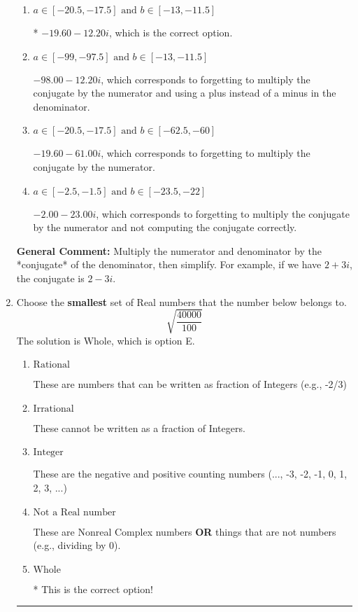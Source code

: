 \documentclass{extbook}[14pt]
\newcommand{\litem}[1]{\item #1

\rule{\textwidth}{0.4pt}}
\begin{document}
\begin{enumerate}
{\begin{enumerate}[label=\Alph*.]
 $-13.50  - 44.00 i$, which corresponds to just dividing the first term by the first term and the second by the second.
\item \( a \in [-20.5, -17.5] \text{ and } b \in [-13, -11.5] \)

* $-19.60  - 12.20 i$, which is the correct option.
\item \( a \in [-99, -97.5] \text{ and } b \in [-13, -11.5] \)

 $-98.00  - 12.20 i$, which corresponds to forgetting to multiply the conjugate by the numerator and using a plus instead of a minus in the denominator.
\item \( a \in [-20.5, -17.5] \text{ and } b \in [-62.5, -60] \)

 $-19.60  - 61.00 i$, which corresponds to forgetting to multiply the conjugate by the numerator.
\item \( a \in [-2.5, -1.5] \text{ and } b \in [-23.5, -22] \)

 $-2.00  - 23.00 i$, which corresponds to forgetting to multiply the conjugate by the numerator and not computing the conjugate correctly.
\end{enumerate}

\textbf{General Comment:} Multiply the numerator and denominator by the *conjugate* of the denominator, then simplify. For example, if we have $2+3i$, the conjugate is $2-3i$.
}
\litem{
Choose the \textbf{smallest} set of Real numbers that the number below belongs to.
\[ \sqrt{\frac{40000}{100}} \]The solution is \( \text{Whole} \), which is option E.\begin{enumerate}[label=\Alph*.]
\item \( \text{Rational} \)

These are numbers that can be written as fraction of Integers (e.g., -2/3)
\item \( \text{Irrational} \)

These cannot be written as a fraction of Integers.
\item \( \text{Integer} \)

These are the negative and positive counting numbers (..., -3, -2, -1, 0, 1, 2, 3, ...)
\item \( \text{Not a Real number} \)

These are Nonreal Complex numbers \textbf{OR} things that are not numbers (e.g., dividing by 0).
\item \( \text{Whole} \)

* This is the correct option!
\end{enumerate}

}
\end{enumerate}
\end{document}
